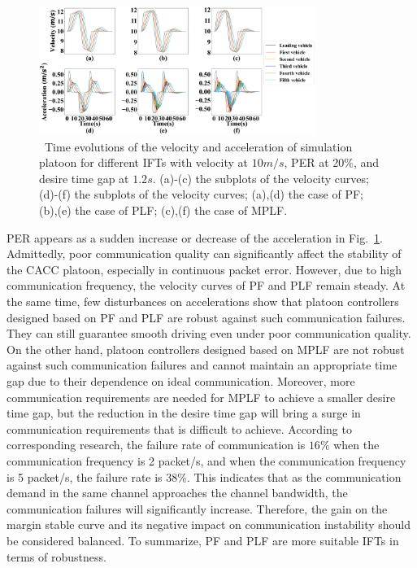 \documentclass[journal]{IEEEtran}
\begin{document}
\begin{figure}
\includegraphics[width=9cm]{fig_5.3.4.png}
\caption{~Time evolutions of the velocity and acceleration of simulation platoon for different IFTs with velocity at $10 m/s$, PER at 20\%, and desire time gap at $1.2 s$. (a)-(c) the subplots of the velocity curves; (d)-(f) the subplots of the velocity curves; (a),(d) the case of PF; (b),(e) the case of PLF; (c),(f) the case of MPLF.} 
\label{Figure7}
\end{figure}

PER appears as a sudden increase or decrease of the acceleration in Fig.~\ref{Figure7}. Admittedly, poor communication quality can significantly affect the stability of the CACC platoon, especially in continuous packet error. However, due to high communication frequency, the velocity curves of PF and PLF remain steady. At the same time, few disturbances on accelerations show that platoon controllers designed based on PF and PLF are robust against such communication failures. They can still guarantee smooth driving even under poor communication quality. On the other hand, platoon controllers designed based on MPLF are not robust against such communication failures and cannot maintain an appropriate time gap due to their dependence on ideal communication. Moreover, more communication requirements are needed for MPLF to achieve a smaller desire time gap, but the reduction in the desire time gap will bring a surge in communication requirements that is difficult to achieve. According to corresponding research\citep{hafeez2013performance}, the failure rate of communication is $16\%$ when the communication frequency is 2 packet/s, and when the communication frequency is 5 packet/s, the failure rate is $38\%$. This indicates that as the communication demand in the same channel approaches the channel bandwidth, the communication failures will significantly increase. Therefore, the gain on the margin stable curve and its negative impact on communication instability should be considered balanced.
To summarize, PF and PLF are more suitable IFTs in terms of robustness.
\end{document}
